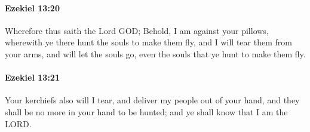 		\paragraph{Ezekiel 13:20} %
			\label{EZEKIEL-13-20}

			Wherefore thus saith the Lord GOD; Behold, I am against your pillows, wherewith ye there hunt the souls to make them fly, and I will tear them from your arms, and will let the souls go, even the souls that ye hunt to make them fly.


		\paragraph{Ezekiel 13:21} %
			\label{EZEKIEL-13-21}

			Your kerchiefs also will I tear, and deliver my people out of your hand, and they shall be no more in your hand to be hunted; and ye shall know that I am the LORD.

